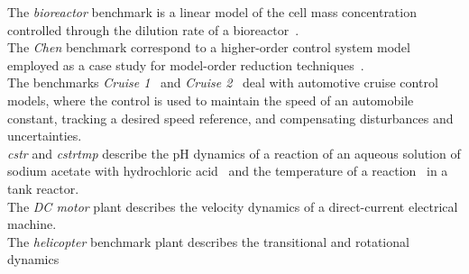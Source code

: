 The \textit{bioreactor} benchmark is a linear model 
of the cell mass concentration controlled through the dilution rate of a bioreactor~\cite{bioreactor}.\\ 
%
The \textit{Chen}
benchmark correspond to a higher-order control system 
model employed as a case study for model-order reduction techniques~\cite{CHEN1979389}.  \\
%
The benchmarks \textit{Cruise 1}~\cite{Franklin15} and \textit{Cruise 2}~\cite{Astrom08} deal with automotive cruise control models, 
where the control is used to maintain the speed of an automobile constant, 
tracking a desired speed reference, and compensating disturbances and uncertainties. \\ %
\textit{cstr}  and \textit{cstrtmp}  describe the pH dynamics of a reaction 
of an aqueous solution of sodium acetate with hydrochloric acid~\cite{cstr} and 
the temperature of a reaction~\cite{astrom2006advanced} in a 
tank reactor. \\ 
The \textit{DC motor} plant  describes the velocity 
dynamics of a 
direct-current electrical machine. \\ 
%
The \textit{helicopter} benchmark plant  describes the transitional and rotational dynamics 
